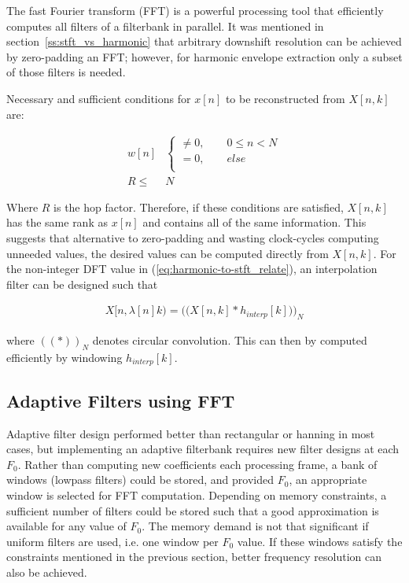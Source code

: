 \documentclass [11pt, proquest,oneside] {ganter_thesis}[2015/03/03]
\begin{document}
The fast Fourier transform (FFT) is a powerful processing tool that efficiently computes all filters of a filterbank in parallel.  It was mentioned in section~\ref{ss:stft_vs_harmonic} that arbitrary downshift resolution can be achieved by zero-padding an FFT; however, for harmonic envelope extraction only a subset of those filters is needed.

Necessary and sufficient conditions for $x[n]$ to be reconstructed from $X[n,k]$ \cite{portnoff1976implementation} are:

\begin{align}
w[n]& \left\{
                \begin{array}{ll}
                \neq 0, \qquad 0 \leq n < N \nonumber \\
			   = 0, \qquad else \\
                \end{array}
              \right. \\
%
              R \leq& N \nonumber
\end{align}

Where $R$ is the hop factor.  Therefore, if these conditions are satisfied, $X[n,k]$ has the same rank as $x[n]$ and contains all of the same information.  This suggests that alternative to zero-padding and wasting clock-cycles computing unneeded values, the desired values can be computed directly from $X[n,k]$.  For the non-integer DFT value in (\ref{eq:harmonic-to-stft_relate}), an interpolation filter can be designed such that 

\begin{align}
X[n, \lambda[n]k)  = \Big(\Big(X[n,k] * h_{interp}[k]\Big)\Big)_N
\end{align}

where $((*))_N$ denotes circular convolution.  This can then by computed efficiently by windowing $h_{interp}[k]$.


\subsection{Adaptive Filters using FFT}

Adaptive filter design performed better than rectangular or hanning in most cases, but implementing an adaptive filterbank requires new filter designs at each $F_0$.  Rather than computing new coefficients each processing frame, a bank of windows (lowpass filters) could be stored, and provided $F_0$, an appropriate window is selected for FFT computation.  Depending on memory constraints, a sufficient number of filters could be stored such that a good approximation is available for any value of $F_0$.  The memory demand is not that significant if uniform filters are used, i.e. one window per $F_0$ value.  If these windows satisfy the constraints mentioned in the previous section, better frequency resolution can also be achieved.
\end{document}
